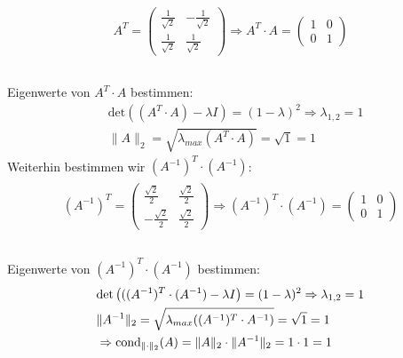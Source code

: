 \begin{align*}
\begin{split}
A^T =
\begin{pmatrix}
\frac{1}{\sqrt{2}}&-\frac{1}{\sqrt{2}}\\
\frac{1}{\sqrt{2}}&\frac{1}{\sqrt{2}}
\end{pmatrix}
\Rightarrow A^T\cdot A=
\begin{pmatrix}
1&0\\
0&1
\end{pmatrix}\\
\end{split}
\end{align*}\\
Eigenwerte von $A^T\cdot A$ bestimmen:\\
\begin{align*}
&\mathrm{det}\left((A^T\cdot A)-\lambda I\right)=(1-\lambda)^2
\Rightarrow \lambda_{1,2}=1\\
&\|A\|_2=\sqrt{\lambda_{max}(A^T\cdot A)}=\sqrt{1}=1
\end{align*}
Weiterhin bestimmen wir $(A^{-1})^T\cdot(A^{-1})$:\\
\begin{align*}
\begin{split}
(A^{-1})^T =
\begin{pmatrix}
\frac{\sqrt{2}}{2}&\frac{\sqrt{2}}{2}\\
-\frac{\sqrt{2}}{2}&\frac{\sqrt{2}}{2}
\end{pmatrix}
\Rightarrow (A^{-1})^T\cdot(A^{-1})=
\begin{pmatrix}
1&0\\
0&1
\end{pmatrix}\\
\end{split}
\end{align*}\\
Eigenwerte von $(A^{-1})^T\cdot(A^{-1})$ bestimmen:\\
\begin{align*}
&\mathrm{det}\left(((A^{-1})^T\cdot(A^{-1})-\lambda I\right)=(1-\lambda)^2
\Rightarrow \lambda_{1,2}=1\\
&\|A^{-1}\|_2=\sqrt{\lambda_{max}((A^{-1})^T\cdot A^{-1})}=\sqrt{1}=1\\
&\Rightarrow\mathrm{cond}_{\| \cdot \|_2}(A)=\|A\|_2\cdot\|A^{-1}\|_2=1 \cdot 1=1\\
\end{align*}

